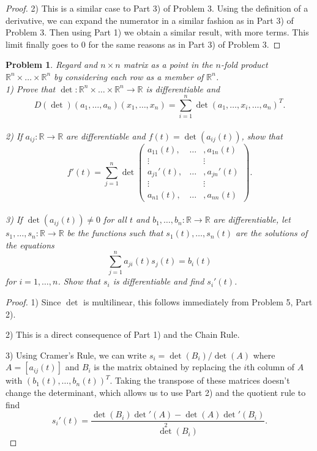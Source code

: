 \documentclass{article}
\newtheorem{problem}{Problem}
\begin{document}
\begin{flushleft}
\begin{proof}
2) This is a similar case to Part 3) of Problem 3. Using the definition of a derivative, we can expand the numerator in a similar fashion as in Part 3) of Problem 3. Then using Part 1) we obtain a similar result, with more terms. This limit finally goes to $0$ for the same reasons as in Part 3) of Problem 3.
\end{proof}

\begin{problem}
Regard and $n \times n$ matrix as a point in the $n$-fold product $\mathbb{R}^n \times \dots \times \mathbb{R}^n$ by considering each row as a member of $\mathbb{R}^n$.\\
1) Prove that $\det : \mathbb{R}^n \times \dots \times \mathbb{R}^n \rightarrow \mathbb{R}$ is differentiable and
\[
D(\det)(a_1, \dots , a_n)(x_1, \dots , x_n) = \sum_{i=1}^{n} \det (a_1, \dots , x_i, \dots , a_n)^T.
\]\\
2) If $a_{ij} : \mathbb{R} \rightarrow \mathbb{R}$ are differentiable and $f(t) = \det (a_{ij}(t))$, show that
\[
f'(t) = \sum_{j=1}^n \det
\left (
\begin{array}{ccc}
a_{11}(t), & \dots & , a_{1n}(t)\\
\vdots & & \vdots\\
a_{j1}'(t), & \dots & , a_{jn}'(t)\\
\vdots & & \vdots\\
a_{n1}(t), & \dots & , a_{nn}(t)
\end{array}
\right ).
\]\\
3) If $\det (a_{ij}(t)) \neq 0$ for all $t$ and $b_1, \dots , b_n : \mathbb{R} \rightarrow \mathbb{R}$ are differentiable, let $s_1, \dots , s_n : \mathbb{R} \rightarrow \mathbb{R}$ be the functions such that $s_1 (t), \dots , s_n(t)$ are the solutions of the equations
\[
\sum_{j=1}^n a_{ji}(t)s_j(t) = b_i(t)
\]
for $i = 1, \dots , n$. Show that $s_i$ is differentiable and find $s_i'(t)$.
\end{problem}
\begin{proof}
1) Since $\det$ is multilinear, this follows immediately from Problem 5, Part 2).\newline

2) This is a direct consequence of Part 1) and the Chain Rule.\newline

3) Using Cramer's Rule, we can write $s_i = \det (B_i) / \det (A)$ where $A = [a_{ij}(t)]$ and $B_i$ is the matrix obtained by replacing the $i$th column of $A$ with $(b_1(t), \dots , b_n(t))^T$. Taking the transpose of these matrices doesn't change the determinant, which allows us to use Part 2) and the quotient rule to find
\[
s_i'(t) = \frac{\det(B_i) \det'(A) - \det(A)\det'(B_i)}{\det^2(B_i)}.
\]
\end{proof}


\end{flushleft}
\end{document}
